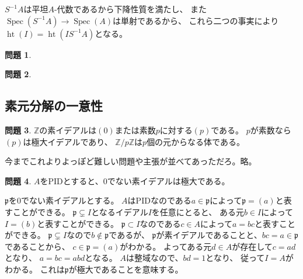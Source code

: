 \documentclass[uplatex]{jsarticle}
\makeatletter
\theoremstyle{definition}
\newtheorem{prob}[prob]{問題}
\renewenvironment{proof}[1][\proofname]{
  \pushQED{\qed}%
  \normalfont \topsep6\p@\@plus6\p@\relax
  \trivlist
  \item[\hskip\labelsep
    #1\@addpunct{\textbf{.}}]\ignorespaces
}{%
  \popQED\endtrivlist\@endpefalse
}
\providecommand{\proofname}{証明}
\DeclareMathOperator{\Spec}{\mathrm{Spec}}
\DeclareMathOperator{\hight}{\mathrm{ht}}
\newcommand\Z{\mathbb{Z}}
\newcommand\mfp{\mathfrak{p}}
\makeatother
\begin{document}
\begin{proof}
  \(S^{-1}A\)は平坦\(A\)-代数であるから下降性質を満たし、
  また\(\Spec(S^{-1}A) \to \Spec(A)\)は単射であるから、
  これら二つの事実により\(\hight(I) = \hight(IS^{-1}A)\)となる。
\end{proof}




\begin{prob}\label{prob: 2.4.2}

\end{prob}



\begin{prob}\label{prob: 2.4.3}

\end{prob}




\subsection{素元分解の一意性}


\begin{prob}\label{prob: 2.5.1}
  \(\Z\)の素イデアルは\((0)\)または素数\(p\)に対する\((p)\)である。
  \(p\)が素数なら\((p)\)は極大イデアルであり、
  \(\Z/p\Z\)は\(p\)個の元からなる体である。
\end{prob}

\begin{proof}
  今までこれよりよっぽど難しい問題や主張が並べてあっただろ。略。
\end{proof}


\begin{prob}\label{prob: 2.5.2}
  \(A\)をPIDとすると、\(0\)でない素イデアルは極大である。
\end{prob}

\begin{proof}
  \(\mfp\)を\(0\)でない素イデアルとする。
  \(A\)はPIDなのである\(a\in \mfp\)によって\(\mfp = (a)\)と表すことができる。
  \(\mfp \subsetneq I\)となるイデアル\(I\)を任意にとると、
  ある元\(b\in I\)によって\(I=(b)\)と表すことができる。
  \(\mfp \subset I\)なのである\(c\in A\)によって\(a=bc\)と表すことができる。
  \(\mfp \subsetneq I\)なので\(b\not\in \mfp\)であるが、
  \(\mfp\)が素イデアルであることと、\(bc=a\in \mfp\)であることから、
  \(c\in \mfp = (a)\)がわかる。
  よってある元\(d\in A\)が存在して\(c=ad\)となり、
  \(a=bc=abd\)となる。
  \(A\)は整域なので、\(bd=1\)となり、
  従って\(I=A\)がわかる。
  これは\(\mfp\)が極大であることを意味する。
\end{proof}
\end{document}
